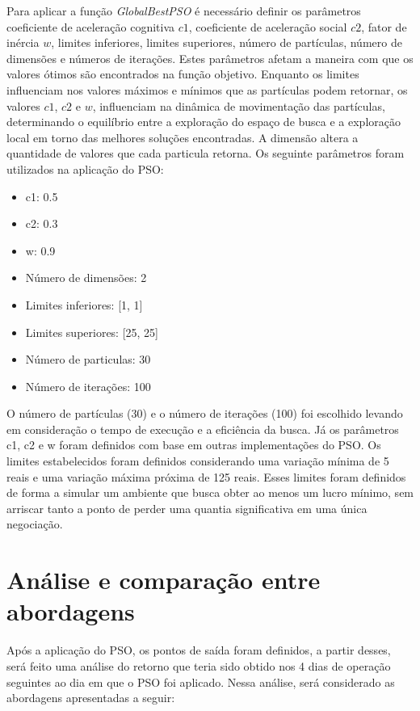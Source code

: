 \documentclass{iftex2024}
\begin{document}
Para aplicar a função \textit{GlobalBestPSO} é necessário definir os parâmetros coeficiente 
de aceleração cognitiva $c1$, coeficiente de aceleração social $c2$, fator de inércia
$w$, limites inferiores, limites superiores, número de partículas, número de dimensões e
números de iterações. Estes parâmetros afetam a maneira com que os valores ótimos são
encontrados na função objetivo. Enquanto os limites influenciam nos valores máximos e
mínimos que as partículas podem retornar, os valores $c1$, $c2$ e $w$, influenciam na dinâmica
de movimentação das partículas, determinando o equilíbrio entre a exploração do espaço
de busca e a exploração local em torno das melhores soluções encontradas. A dimensão
altera a quantidade de valores que cada particula retorna. Os seguinte parâmetros foram
utilizados na aplicação do PSO:

\begin{itemize}
  \item c1: 0.5
  \item c2: 0.3
  \item w: 0.9
  \item Número de dimensões: 2
  \item Limites inferiores: [1, 1]
  \item Limites superiores: [25, 25]
  \item Número de particulas: 30
  \item Número de iterações: 100
\end{itemize}

O número de partículas (30) e o número de iterações (100) foi escolhido levando em consideração o tempo de execução e a 
eficiência da busca. Já os parâmetros 
c1, c2 e w foram definidos com base em outras implementações do PSO. Os limites 
estabelecidos foram definidos considerando uma variação mínima de 5 reais e uma variação máxima próxima de 125 reais. 
Esses limites foram definidos de forma a simular um ambiente que busca obter ao menos um lucro mínimo, sem 
arriscar tanto a ponto de perder uma quantia significativa em uma única negociação.

\section{Análise e comparação entre abordagens}

Após a aplicação do PSO, os pontos de saída
foram definidos, a partir desses, será feito uma análise do retorno que
teria sido obtido nos 4 dias de operação seguintes ao dia em que o PSO foi aplicado. Nessa análise, será considerado as
abordagens apresentadas a seguir:
\end{document}
